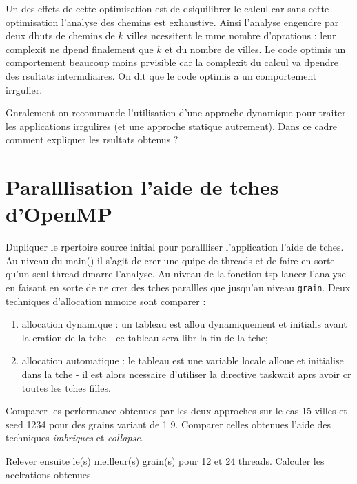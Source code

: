 \documentclass[A4wide]{article}
\begin{document}
Un des effets de cette optimisation est de dsiquilibrer le calcul car
sans cette optimisation l'analyse des chemins est exhaustive.  Ainsi
l'analyse engendre par deux dbuts de chemins de $k$ villes
ncessitent le mme nombre d'oprations : leur complexit ne dpend
finalement que $k$ et du nombre de villes. Le code optimis  un
comportement beaucoup moins prvisible car la complexit du calcul va
dpendre des rsultats intermdiaires. On dit que le code optimis a
un comportement irrgulier. 

Gnralement on recommande l'utilisation d'une approche dynamique pour
traiter les applications irrgulires (et une approche statique
autrement).  Dans ce cadre comment expliquer les rsultats obtenus ?

\section{Paralllisation  l'aide de tches d'OpenMP}

Dupliquer le rpertoire source initial pour parallliser l'application
 l'aide de tches. Au niveau du main() il s'agit de crer une quipe
de threads et de faire en sorte qu'un seul thread dmarre
l'analyse. Au niveau de la fonction tsp lancer l'analyse en faisant en
sorte de ne crer des tches parallles que jusqu'au niveau
\texttt{grain}. Deux techniques d'allocation mmoire sont  comparer :
\begin{enumerate}
\item allocation dynamique : un tableau est allou dynamiquement et
  initialis avant la cration de la tche - ce tableau sera libr 
  la fin de la tche;
\item allocation automatique : le tableau est une variable locale
  alloue et initialise dans la tche - il est alors ncessaire
  d'utiliser la directive taskwait aprs avoir cr toutes les tches filles.
\end{enumerate}

Comparer les performance obtenues par les deux approches sur le cas 15
villes et seed 1234 pour des grains variant de 1  9. Comparer 
celles obtenues  l'aide des techniques \emph{imbriques} et \emph{collapse}.

Relever ensuite le(s) meilleur(s) grain(s) pour 12 et 24
threads. Calculer les acclrations obtenues.
\end{document}
